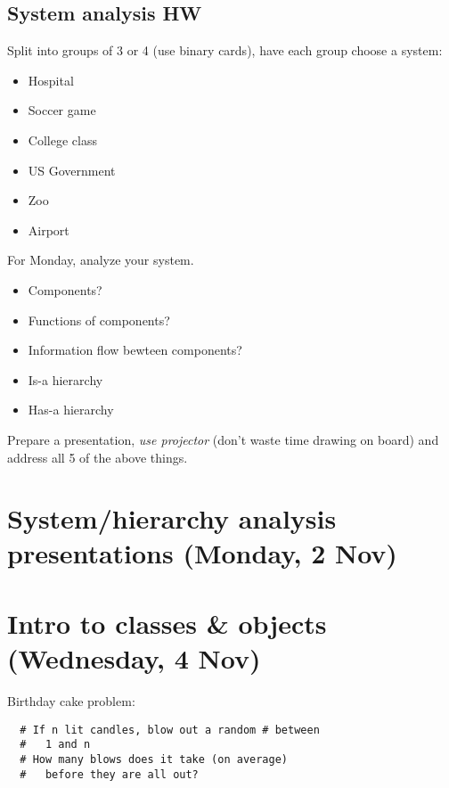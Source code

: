 \documentclass{article}
\begin{document}
\subsection*{System analysis HW}

Split into groups of 3 or 4 (use binary cards), have each group choose
a system:

\begin{itemize}
\item Hospital
\item Soccer game
\item College class
\item US Government
\item Zoo
\item Airport
\end{itemize}

For Monday, analyze your system.
\begin{itemize}
\item Components?
\item Functions of components?
\item Information flow bewteen components?
\item Is-a hierarchy
\item Has-a hierarchy
\end{itemize}

Prepare a presentation, \emph{use projector} (don't waste time drawing
on board) and address all 5 of the above things.

\section*{System/hierarchy analysis presentations (Monday, 2 Nov)}

\section*{Intro to classes \& objects (Wednesday, 4 Nov)}

Birthday cake problem:
\begin{verbatim}
  # If n lit candles, blow out a random # between
  #   1 and n
  # How many blows does it take (on average)
  #   before they are all out?
\end{verbatim}
\end{document}
